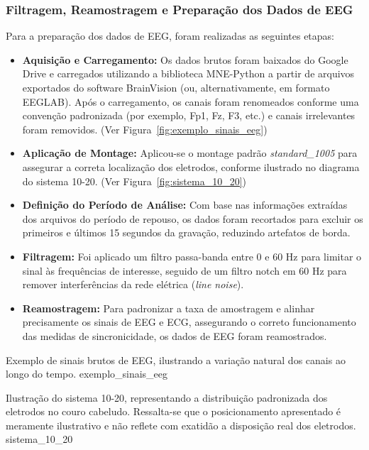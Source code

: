 \subsubsection{Filtragem, Reamostragem e Preparação dos Dados de EEG}
Para a preparação dos dados de EEG, foram realizadas as seguintes etapas:
\begin{itemize}
    \item \textbf{Aquisição e Carregamento:} Os dados brutos foram baixados do Google Drive e carregados utilizando a biblioteca MNE-Python a partir de arquivos exportados do software BrainVision (ou, alternativamente, em formato EEGLAB). Após o carregamento, os canais foram renomeados conforme uma convenção padronizada (por exemplo, Fp1, Fz, F3, etc.) e canais irrelevantes foram removidos. (Ver Figura~\ref{fig:exemplo_sinais_eeg})
    \item \textbf{Aplicação de Montage:} Aplicou-se o montage padrão \textit{standard\_1005} para assegurar a correta localização dos eletrodos, conforme ilustrado no diagrama do sistema 10-20. (Ver Figura~\ref{fig:sistema_10_20})
    \item \textbf{Definição do Período de Análise:} Com base nas informações extraídas dos arquivos do período de repouso, os dados foram recortados para excluir os primeiros e últimos 15 segundos da gravação, reduzindo artefatos de borda.
    \item \textbf{Filtragem:} Foi aplicado um filtro passa-banda entre 0 e 60 Hz para limitar o sinal às frequências de interesse, seguido de um filtro notch em 60 Hz para remover interferências da rede elétrica (\textit{line noise}).
    \item \textbf{Reamostragem:} Para padronizar a taxa de amostragem e alinhar precisamente os sinais de EEG e ECG, assegurando o correto funcionamento das medidas de sincronicidade, os dados de EEG foram reamostrados.
\end{itemize}

{Exemplo de sinais brutos de EEG, ilustrando a variação natural dos canais ao longo do tempo.}
{exemplo_sinais_eeg}

{Ilustração do sistema 10-20, representando a distribuição padronizada dos eletrodos no couro cabeludo. Ressalta-se que o posicionamento apresentado é meramente ilustrativo e não reflete com exatidão a disposição real dos eletrodos.}
{sistema_10_20}

